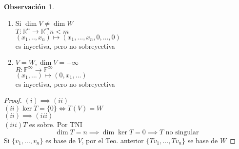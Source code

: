 \documentclass[11pt]{book}
\theoremstyle{definition}
\newtheorem{obs}{Observación}[section]
\begin{document}
\begin{obs}
\
\begin{enumerate}
	\item Si $\dim V\neq\dim W$\\
	$T:\mathbb{R}^n\rightarrow\mathbb{R}^m n<m$\\
	$(x_1,..,x_n)\mapsto (x_1,...,x_n,0,...,0)$\\
	es inyectiva, pero no sobreyectiva
	
	\item $V=W,\dim V=+\infty$\\
	$R:\mathbb{F}^\infty\rightarrow\mathbb{F}^\infty$\\
	$(x_1,...)\mapsto (0,x_1,...)$\\
	es inyectiva, pero no sobreyectiva
\end{enumerate}
\end{obs}
\begin{proof}
$(i)\implies (ii)$\\
$(ii) \ker T=\{0\}\iff T(V)=W$\\
$(ii)\implies (iii)$\\
$(iii) T$ es sobre. Por TNI
\[
\dim T=n\implies\dim\ker T=0\implies T\textrm{ no singular}
\]
Si $\{v_1,...,v_n\}$ es base de $V$, por el Teo. anterior $\{Tv_1,...,Tv_n\}$ se base de $W$
\end{proof}
\end{document}
